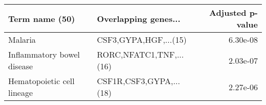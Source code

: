 \begin{tabular}{llr}
\toprule
            Term name (50) &    Overlapping genes... &  Adjusted p-value \\
\midrule
                   Malaria &   CSF3,GYPA,HGF,...(15) &          6.30e-08 \\
Inflammatory bowel disease & RORC,NFATC1,TNF,...(16) &          2.03e-07 \\
Hematopoietic cell lineage & CSF1R,CSF3,GYPA,...(18) &          2.27e-06 \\
\bottomrule
\end{tabular}
